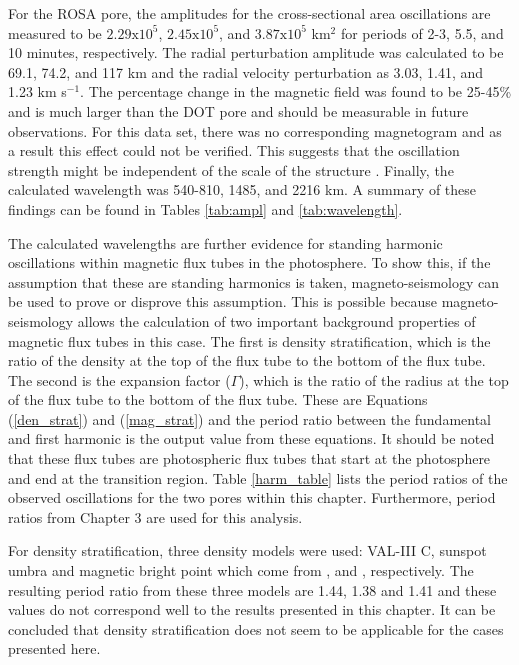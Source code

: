 	For the ROSA pore, the amplitudes for the cross-sectional area oscillations are measured to be $2.29\mathrm{x}10^5$, $2.45\mathrm{x}10^5$, and $3.87\mathrm{x}10^5$ km$^2$ for periods of 2-3, 5.5, and 10 minutes, respectively.
    The radial perturbation amplitude was calculated to be 69.1, 74.2, and 117 km and the radial velocity perturbation as 3.03, 1.41, and 1.23 km s$^{-1}$.
    The percentage change in the magnetic field was found to be  25-45\% and is much larger than the DOT pore and should be measurable in future observations. 
    For this data set, there was no corresponding magnetogram and as a result this effect could not be verified.
    This suggests that the oscillation strength might be independent of the scale of the structure \citep{Dorotovic2014}. 
    Finally, the calculated wavelength was 540-810, 1485, and 2216 km.
    A summary of these findings can be found in Tables \ref{tab:ampl} and \ref{tab:wavelength}.
      
    The calculated wavelengths are further evidence for standing harmonic oscillations within magnetic flux tubes in the photosphere.
    To show this, if the assumption that these are standing harmonics is taken, magneto-seismology can be used to prove or disprove this assumption.
    This is possible because magneto-seismology allows the calculation of two important background properties of magnetic flux tubes in this case.
    The first is density stratification, which is the ratio of the density at the top of the flux tube to the bottom of the flux tube.
    The second is the expansion factor ($\Gamma$), which is the ratio of the radius at the top of the flux tube to the bottom of the flux tube.
    These are Equations (\ref{den_strat}) and (\ref{mag_strat}) and the period ratio between the fundamental and first harmonic is the output value from these equations.
    It should be noted that these flux tubes are photospheric flux tubes that start at the photosphere and end at the transition region.
    Table \ref{harm_table} lists the period ratios of the observed oscillations for the two pores within this chapter.
    Furthermore, period ratios from Chapter 3 are used for this analysis.

	For density stratification, three density models were used: VAL-III C, sunspot umbra and magnetic bright point which come from \cite{1981ApJS...45..635V}, \cite{Maltby1986} and \cite{GFME13a,GFE14}, respectively.
	The resulting period ratio from these three models are 1.44, 1.38 and 1.41 and these values do not correspond well to the results presented in this chapter.
	It can be concluded that density stratification does not seem to be applicable for the cases presented here.

